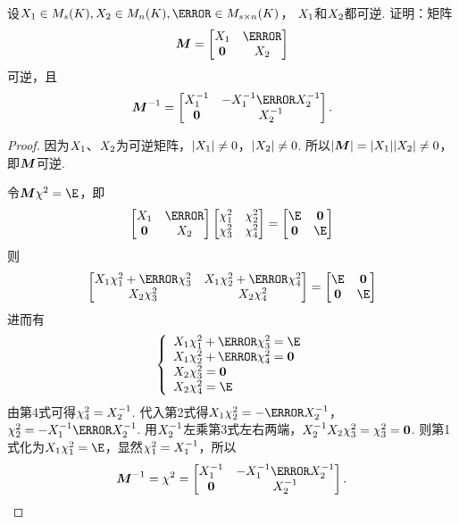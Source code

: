 \begin{example}\label{example:可逆矩阵.分块上三角矩阵的逆}
设\(\A \in M_s(K),
\B \in M_n(K),
\C \in M_{s \times n}(K)\)，
\(X_1\)和\(X_2\)都可逆.
证明：矩阵\[
	\vb{M} = \begin{bmatrix}
		\A & \C \\
		\vb0 & \B
	\end{bmatrix}
\]可逆，且\[
	\vb{M}^{-1} = \begin{bmatrix}
		\A^{-1} & -\A^{-1} \C \B^{-1} \\
		\vb0 & \B^{-1}
	\end{bmatrix}.
\]
\begin{proof}
因为\(X_1\)、\(X_2\)为可逆矩阵，\(\abs{X_1} \neq 0\)，\(\abs{X_2} \neq 0\).
所以\(\abs{\boldsymbol{M}}=\abs{X_1}\abs{X_2} \neq 0\)，即\(\boldsymbol{M}\)可逆.

令\(\vb{M}\x=\E\)，即\[
	\begin{bmatrix}
		\A & \C \\
		\vb0 & \B
	\end{bmatrix}
	\begin{bmatrix}
		\x_1 & \x_2 \\
		\x_3 & \x_4
	\end{bmatrix}
	= \begin{bmatrix}
		\E & \vb0 \\
		\vb0 & \E
	\end{bmatrix}
\]则\[
	\begin{bmatrix}
		\A\x_1+\C\x_3 & \A\x_2+\C\x_4 \\
		\B\x_3 & \B\x_4
	\end{bmatrix}
	= \begin{bmatrix}
		\E & \vb0 \\
		\vb0 & \E
	\end{bmatrix}
\]
进而有\[
	\left\{ \begin{array}{l}
		\A\x_1+\C\x_3 = \E \\
		\A\x_2+\C\x_4 = \vb0 \\
		\B\x_3 = \vb0 \\
		\B\x_4 = \E
	\end{array} \right.
\]
由第4式可得\(\chi^2_4 = X_2^{-1}\).
代入第2式得\(\A\x_2=-\C\B^{-1}\)，
\(\x_2=-\A^{-1}\C\B^{-1}\).
用\(X_2^{-1}\)左乘第3式左右两端，\(X_2^{-1}X_2\chi^2_3=\chi^2_3=\boldsymbol0\).
则第1式化为\(\A\x_1=\E\)，显然\(\chi^2_1=X_1^{-1}\)，所以\[
	\vb{M}^{-1} = \x = \begin{bmatrix}
		\A^{-1} & -\A^{-1}\C\B^{-1} \\
		\vb0 & \B^{-1}
	\end{bmatrix}.
	\qedhere
\]
\end{proof}
\end{example}


